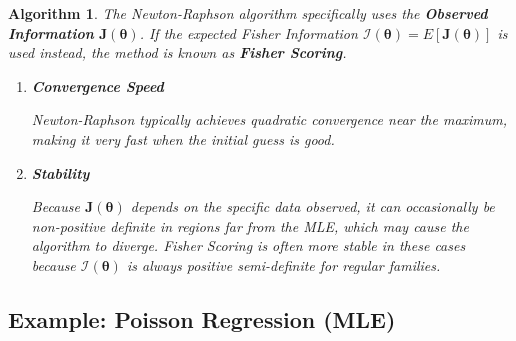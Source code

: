 \documentclass[
  letterpaper,
  DIV=11,
  numbers=noendperiod]{scrreprt}
\renewcommand{\[}{\begin{equation}}
\renewcommand{\]}{\end{equation}}
\theoremstyle{definition}
\theoremstyle{plain}
\newtheorem{algorithm}{Algorithm}[chapter]
\theoremstyle{plain}
\theoremstyle{plain}
\theoremstyle{definition}
\theoremstyle{plain}
\theoremstyle{remark}
\begin{document}
\begin{algorithm}

The Newton-Raphson algorithm specifically uses the \textbf{Observed
Information} \(\mathbf{J}(\boldsymbol{\theta})\). If the expected Fisher
Information
\(\mathcal{I}(\boldsymbol{\theta}) = E[\mathbf{J}(\boldsymbol{\theta})]\)
is used instead, the method is known as \textbf{Fisher Scoring}.

\begin{enumerate}
\def\labelenumi{\arabic{enumi}.}
\item
  \textbf{Convergence Speed}

  Newton-Raphson typically achieves quadratic convergence near the
  maximum, making it very fast when the initial guess is good.
\item
  \textbf{Stability}

  Because \(\mathbf{J}(\boldsymbol{\theta})\) depends on the specific
  data observed, it can occasionally be non-positive definite in regions
  far from the MLE, which may cause the algorithm to diverge. Fisher
  Scoring is often more stable in these cases because
  \(\mathcal{I}(\boldsymbol{\theta})\) is always positive semi-definite
  for regular families.
\end{enumerate}

\end{algorithm}

\subsection{Example: Poisson Regression
(MLE)}\label{example-poisson-regression-mle-1}
\end{document}
